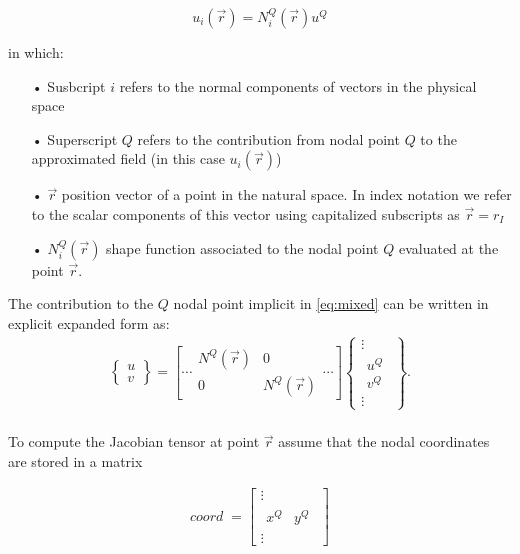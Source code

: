 \begin{equation}
u_i(\overrightarrow r)=N_i^Q(\overrightarrow r)u^Q
\label{eq:mixed}
\end{equation}


in which:

\begin{itemize}
\item[•] Susbcript $i$ refers to the normal components of vectors in the physical space
\item[•] Superscript $Q$ refers to the contribution from nodal point $Q$ to the approximated field (in this case $u_i(\overrightarrow r)$)
\item[•] $\overrightarrow r$ position vector of a point in the natural space. In index notation we refer to the scalar components of this vector using capitalized subscripts as $\overrightarrow r=r_I$
\item[•] $N_i^Q(\overrightarrow r)$ shape function associated to the nodal point $Q$ evaluated at the point $\overrightarrow r$.
\end{itemize}

The contribution to the $Q$ nodal point implicit in \cref{eq:mixed} can be written in explicit expanded form as:
\[
\begin{array}{l}\begin{Bmatrix}u\\v\end{Bmatrix}=\left[\cdots\begin{array}{cc}N^Q(\overrightarrow r)&0\\0&N^Q(\overrightarrow r)\end{array}\cdots\right]\begin{Bmatrix}\vdots\\\begin{array}{c}u^Q\\v^Q\end{array}\\\vdots\end{Bmatrix}.\\\end{array}
\]


To compute the Jacobian tensor at point $\overrightarrow r$ assume that the nodal coordinates are stored in a matrix



\[
\begin{array}{l}coord\;=\begin{bmatrix}\vdots\\\begin{array}{cc}x^Q&y^Q\end{array}\\\vdots\end{bmatrix}\\\end{array}
\]

